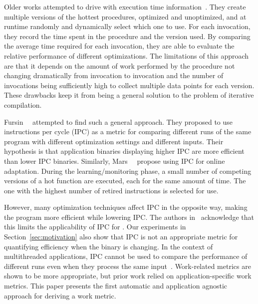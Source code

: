 Older works attempted to drive \itercomp with execution time information~\cite{fursin:hal-01257279,fursin:inria-00001054}. They create
multiple versions of the hottest procedures, optimized and unoptimized, and at runtime randomly and dynamically select which one to use.
For each invocation, they record the time spent in the procedure and the version used. By comparing the average time required for each
invocation, they are able to evaluate the relative performance of different optimizations. The limitations of this approach are that it
depends on the amount of work performed by the procedure not changing dramatically from invocation to invocation and the number of
invocations being sufficiently high to collect multiple data points for each version. These drawbacks keep it from being a general solution
to the problem of iterative compilation.

Fursin~\etal~\cite{fursin07} attempted to find such a general approach. They proposed to use instructions per cycle (IPC)
as a metric for comparing different runs of the same program with different optimization settings and different inputs. Their hypothesis is
that application binaries displaying higher IPC are more efficient than lower IPC binaries. Similarly, Mars~\etal~\cite{Mars:2009:SBO:1545006.1545068}
propose using IPC for online adaptation. During the learning/monitoring phase, a small number of competing versions of a hot function are executed, each
for the same amount of time. The one with the highest number of retired instructions is selected for use. 

However, many optimization techniques affect
IPC in the opposite way, making the program more efficient while lowering IPC. The authors in~\cite{fursin07} acknowledge that this limits
the applicability of IPC for \itercomp. Our experiments in Section~\ref{sec:motivation} also show that IPC is not an appropriate metric
for quantifying efficiency when the binary is changing. In the context of multithreaded applications, IPC cannot be used to compare the performance of
different runs even when they process the same input~\cite{alameldeen06,eyerman08}. Work-related metrics are shown to be more appropriate, but prior work
relied on application-specific work metrics. This paper presents the first automatic and application agnostic approach for deriving a work metric.


